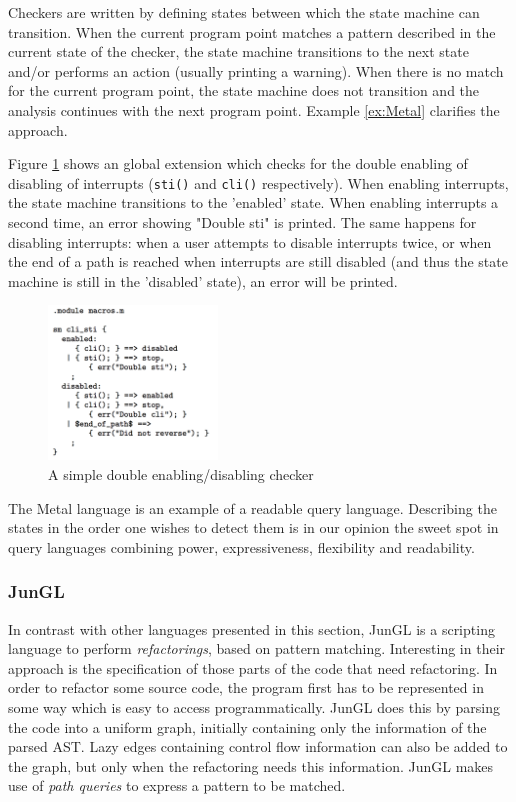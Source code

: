 Checkers are written by defining states between which the state machine can transition. When the current program point matches a pattern described in the current state of the checker, the state machine transitions to the next state and/or performs an action (usually printing a warning). When there is no match for the current program point, the state machine does not transition and the analysis continues with the next program point. Example \ref{ex:Metal} clarifies the approach. 
\begin{exmp}
\label{ex:Metal}
Figure \ref{fig:Metal} shows an global extension which checks for the double enabling of disabling of interrupts (\texttt{sti()} and \texttt{cli()} respectively). When enabling interrupts, the state machine transitions to the 'enabled' state. When enabling interrupts a second time, an error showing "Double sti" is printed. The same happens for disabling interrupts: when a user attempts to disable interrupts twice, or when the end of a path is reached when interrupts are still disabled (and thus the state machine is still in the 'disabled' state), an error will be printed.

\begin{figure}[h]
    \centering
      \includegraphics[width=0.4\textwidth]{images/Metal} 
      \caption{A simple double enabling/disabling checker}
    \label{fig:Metal}
\end{figure}

\end{exmp}

The Metal language is an example of a readable query language. Describing the states in the order one wishes to detect them is in our opinion the sweet spot in query languages combining power, expressiveness, flexibility and readability.

\subsubsection*{JunGL}

In contrast with other languages presented in this section, JunGL\cite{JunGL} is a scripting language to perform \textit{refactorings}, based on pattern matching. Interesting in their approach is the specification of those parts of the code that need refactoring. In order to refactor some source code, the program first has to be represented in some way which is easy to access programmatically. JunGL does this by parsing the code into a uniform graph, initially containing only the information of the parsed AST. Lazy edges containing control flow information can also be added to the graph, but only when the refactoring needs this information. JunGL makes use of \textit{path queries} to express a pattern to be matched. 

